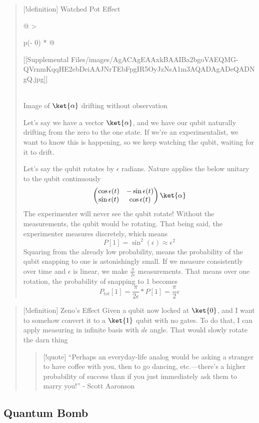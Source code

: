 \documentclass[]{article}
\begin{document}
\begin{quote}
{[}!definition{]} Watched Pot Effect

\begin{longtable}[]{@{}
  >{\raggedright\arraybackslash}p{(\columnwidth - 0\tabcolsep) * }@{}}
\toprule\noalign{}
\begin{minipage}[b]{\linewidth}\raggedright
{[}{[}Supplemental
Files/images/AgACAgEAAxkBAAIBa2bgoVAEQMG-QVrnmKqqHE2ebDeiAAJNrTEbFpgIR5OyJzNsA1m3AQADAgADeQADNgQ.jpg{]}{]}
\end{minipage} \\
\midrule\noalign{}
\endhead
\bottomrule\noalign{}
\endlastfoot
Image of \(\ket{\alpha}\) drifting without observation \\
\end{longtable}

Let's say we have a vector \(\ket{\alpha}\), and we have our qubit
naturally drifting from the zero to the one state. If we're an
experimentalist, we want to know this is happening, so we keep watching
the qubit, waiting for it to drift.

Let's say the qubit rotates by \(\epsilon\) radians. Nature applies the
below unitary to the qubit continuously \[
\begin{pmatrix}
\cos\epsilon(t)  & -\sin\epsilon(t) \\
\sin\epsilon(t) & \cos\epsilon(t)
\end{pmatrix}\ket{\alpha} 
\] The experimenter will never see the qubit rotate! Without the
measurements, the qubit would be rotating. That being said, the
experimenter measures discretely, which means \[
P\left[ 1 \right]  = \sin^{2}{(\epsilon)} \approx \epsilon^{2}
\] Squaring from the already low probability, means the probability of
the qubit snapping to one is astonishingly small. If we measure
consistently over time and \(\epsilon\) is linear, we make
\(\frac{\pi}{2\epsilon}\) measurements. That means over one rotation,
the probability of snapping to 1 becomes \[
P_{tot}\left[ 1 \right]  = \frac{\pi}{2\epsilon}*P[1] = \frac{\pi}{2}\epsilon
\]
\end{quote}

\begin{quote}
{[}!definition{]} Zeno's Effect Given a qubit now locked at \(\ket{0}\),
and I want to somehow convert it to a \(\ket{1}\) qubit with no gates.
To do that, I can apply measuring in infinite basis with \(d\epsilon\)
angle. That would slowly rotate the darn thing

\begin{quote}
{[}!quote{]} ``Perhaps an everyday-life analog would be asking a
stranger to have coffee with you, then to go dancing, etc.---there's a
higher probability of success than if you just immediately ask them to
marry you!'' - Scott Aaronson
\end{quote}
\end{quote}

\hypertarget{quantum-bomb}{%
\subsection{Quantum Bomb}\label{quantum-bomb}}
\end{document}
